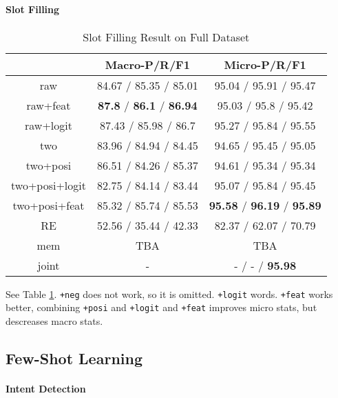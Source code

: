 \paragraph{Slot Filling}
\begin{table}
\setlength{\tabcolsep}{0.23em}
\centering
\small{
\begin{tabular}{|c|c|c|}

\hline
  & Macro-P/R/F1 & Micro-P/R/F1  \\
\hline
raw &  84.67 / 85.35 / 85.01            & 95.04 / 95.91 / 95.47  \\
\hline
raw+feat & \textbf{87.8} / \textbf{86.1} / \textbf{86.94} & 95.03 / 95.8 / 95.42  \\
\hline
raw+logit & 87.43 / 85.98 / 86.7        & 95.27 / 95.84 / 95.55  \\
\hline
two & 83.96 / 84.94 / 84.45             & 94.65 / 95.45 / 95.05 \\
\hline
two+posi & 86.51 / 84.26 / 85.37        & 94.61 / 95.34 / 95.34  \\
\hline
two+posi+logit & 82.75 / 84.14 / 83.44  & 95.07 / 95.84 / 95.45 \\
\hline
two+posi+feat & 85.32 / 85.74 / 85.53   & \textbf{95.58} / \textbf{96.19} / \textbf{95.89} \\
\hline
\hline
RE & 52.56 / 35.44 / 42.33 & 82.37 / 62.07 / 70.79 \\
\hline
mem & TBA & TBA \\
\hline
joint & - & - / - / \textbf{95.98} \\
\hline 

\end{tabular}
}
\caption{Slot Filling Result on Full Dataset}
\label{tab_slot_full}
\end{table}

See Table \ref{tab_slot_full}.
\texttt{+neg} does not work, so it is omitted.
\texttt{+logit} words. \texttt{+feat} works better, combining \texttt{+posi} and \texttt{+logit} and \texttt{+feat} improves micro stats, but descreases macro stats.



\subsection{Few-Shot Learning}
\paragraph{Intent Detection}


